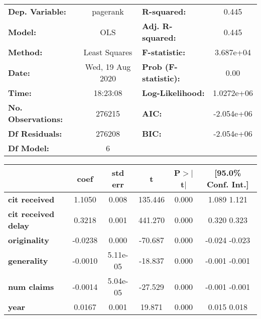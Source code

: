 \begin{center}
\begin{tabular}{lclc}
\toprule
\textbf{Dep. Variable:}     &     pagerank     & \textbf{  R-squared:         } &       0.445     \\
\textbf{Model:}             &       OLS        & \textbf{  Adj. R-squared:    } &       0.445     \\
\textbf{Method:}            &  Least Squares   & \textbf{  F-statistic:       } &   3.687e+04     \\
\textbf{Date:}              & Wed, 19 Aug 2020 & \textbf{  Prob (F-statistic):} &       0.00      \\
\textbf{Time:}              &     18:23:08     & \textbf{  Log-Likelihood:    } &   1.0272e+06    \\
\textbf{No. Observations:}  &      276215      & \textbf{  AIC:               } &   -2.054e+06    \\
\textbf{Df Residuals:}      &      276208      & \textbf{  BIC:               } &   -2.054e+06    \\
\textbf{Df Model:}          &           6      & \textbf{                     } &                 \\
\bottomrule
\end{tabular}
\begin{tabular}{lccccc}
                            & \textbf{coef} & \textbf{std err} & \textbf{t} & \textbf{P$>$$|$t$|$} & \textbf{[95.0\% Conf. Int.]}  \\
\midrule
\textbf{cit received}       &       1.1050  &        0.008     &   135.446  &         0.000        &         1.089     1.121       \\
\textbf{cit received delay} &       0.3218  &        0.001     &   441.270  &         0.000        &         0.320     0.323       \\
\textbf{originality}        &      -0.0238  &        0.000     &   -70.687  &         0.000        &        -0.024    -0.023       \\
\textbf{generality}         &      -0.0010  &     5.11e-05     &   -18.837  &         0.000        &        -0.001    -0.001       \\
\textbf{num claims}         &      -0.0014  &     5.04e-05     &   -27.529  &         0.000        &        -0.001    -0.001       \\
\textbf{year}               &       0.0167  &        0.001     &    19.871  &         0.000        &         0.015     0.018       \\

\end{tabular}
\end{center}
